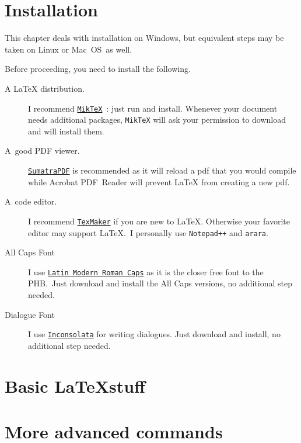 \documentclass[headings=openany, headings=optiontoheadandtoc]{scrbook}
\newcommand{\TeXBrewery}{\TeX brewery}
\begin{document}
\chapter{Installation}

This chapter deals with installation on Windows, but equivalent steps may be taken on Linux or Mac OS as well.


Before proceeding, you need to install the following.
\begin{description}
\item[A LaTeX distribution.] I recommend \texttt{\href{http://miktex.org/download}{MikTeX}} : just run and install. Whenever your document needs additional packages, \texttt{MikTeX} will ask your permission to download and will install them.

\item[A good PDF viewer.] \texttt{\href{http://www.sumatrapdfreader.org/downloadafter.html}{SumatraPDF}} is recommended as it will reload a pdf that you would compile while Acrobat PDF Reader will prevent LaTeX from creating a new pdf.

\item[A code editor.] I recommend \texttt{\href{http://www.xm1math.net/texmaker/index_fr.html}{TexMaker}} if you are new to \LaTeX . Otherwise your favorite editor may support \LaTeX . I personally use \texttt{Notepad++} and \texttt{arara}.

\item[All Caps Font] I use \texttt{\href{http://www.fontsquirrel.com/fonts/list/foundry/gust-e-foundry}{Latin Modern Roman Caps}} as it is the closer free font to the PHB. Just download and install the All Caps versions, no additional step needed.

\item[Dialogue Font] I use \texttt{\href{http://www.levien.com/type/myfonts/Inconsolata.otf}{Inconsolata}} for writing dialogues. Just download and install, no additional step needed.
\end{description}

\addsec{Set up the \TeXBrewery}




\chapter{Basic \LaTeX stuff}





\chapter{More advanced commands}

\end{document}
